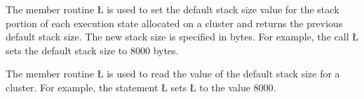 \documentclass[openright,twoside]{report}
\begin{document}
The member routine \LGinlinetrue\LGbegin\lgrinde\L{}\endlgrinde\LGend{} is used to set the default stack size value for the stack portion of each execution state allocated on a cluster and returns the previous default stack size.
The new stack size is specified in bytes.
For example, the call \LGinlinetrue\LGbegin\lgrinde\L{}\endlgrinde\LGend{} sets the default stack size to 8000 bytes.

The member routine \LGinlinetrue\LGbegin\lgrinde\L{}\endlgrinde\LGend{} is used to read the value of the default stack size for a cluster.
For example, the statement \LGinlinetrue\LGbegin\lgrinde\L{}\endlgrinde\LGend{} sets \LGinlinetrue\LGbegin\lgrinde\L{}\endlgrinde\LGend{} to the value 8000.
\end{document}
